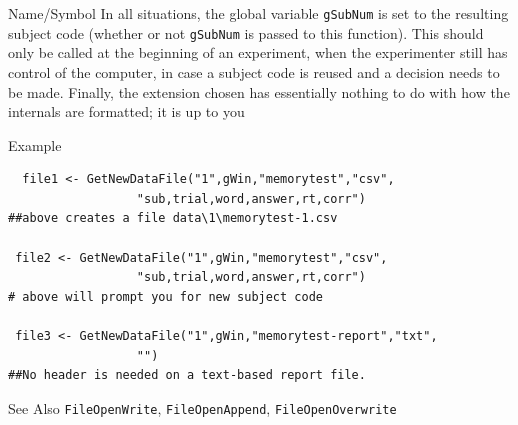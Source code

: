 \begin{desc}{Name/Symbol}
In all situations, the global variable \verb+gSubNum+ is set to the resulting subject code (whether or not \verb+gSubNum+ is passed to this function). This should only be called at the beginning of an experiment, when the experimenter still has control of the computer, in case a subject code is reused and a decision needs to be made.  Finally, the extension chosen has essentially nothing to do with how the internals are formatted; it is up to you 


\item[Example]
\begin{verbatim}
  file1 <- GetNewDataFile("1",gWin,"memorytest","csv",
                  "sub,trial,word,answer,rt,corr")
##above creates a file data\1\memorytest-1.csv

 file2 <- GetNewDataFile("1",gWin,"memorytest","csv",
                  "sub,trial,word,answer,rt,corr")
# above will prompt you for new subject code

 file3 <- GetNewDataFile("1",gWin,"memorytest-report","txt",
                  "")
##No header is needed on a text-based report file.

\end{verbatim}

\item[See Also]	
\verb+FileOpenWrite+, \verb+FileOpenAppend+, \verb+FileOpenOverwrite+
\end{desc}


